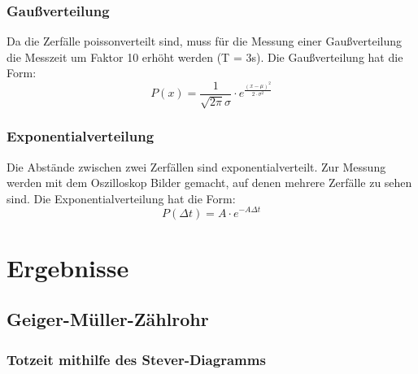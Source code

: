\documentclass[12pt,a4paper]{article}
\begin{document}
\subsubsection{Gaußverteilung}
Da die Zerfälle poissonverteilt sind, muss für die Messung einer Gaußverteilung die Messzeit um Faktor 10 erhöht werden (T = 3s). Die Gaußverteilung hat die Form:
\begin{equation}
P(x) = \dfrac{1}{\sqrt{2 \pi} \sigma} \cdot e^{\frac{(x - \mu)^2}{2 \cdot \sigma ^2}}
\end{equation}
\subsubsection{Exponentialverteilung}
Die Abstände zwischen zwei Zerfällen sind exponentialverteilt. Zur Messung werden mit dem Oszilloskop Bilder gemacht, auf denen mehrere Zerfälle zu sehen sind. Die Exponentialverteilung hat die Form:
\begin{equation}
P(\Delta t) = A \cdot e^{- A \Delta t}
\end{equation}
\newpage
\section{Ergebnisse}
\subsection{Geiger-Müller-Zählrohr}

\subsubsection{Totzeit mithilfe des Stever-Diagramms}
\end{document}

